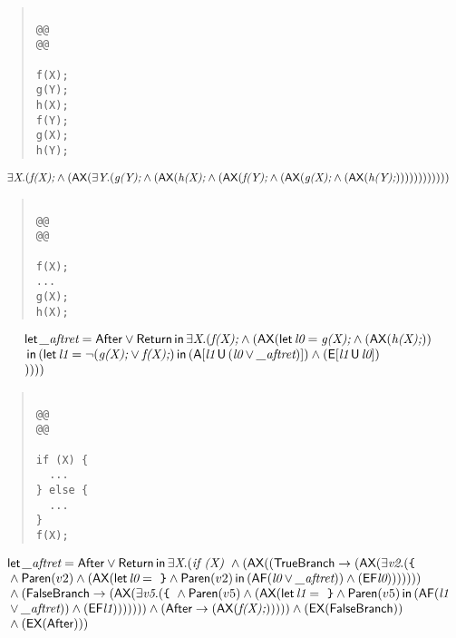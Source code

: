 \documentclass{article}
\newcommand{\U}{\,\mbox{\sf{U}}\,}
\newcommand{\A}{\mbox{\sf{A}}}
\newcommand{\E}{\mbox{\sf{E}}}
\newcommand{\AX}{\mbox{\sf{AX}}}
\newcommand{\EX}{\mbox{\sf{EX}}}
\newcommand{\AF}{\mbox{\sf{AF}}}
\newcommand{\EF}{\mbox{\sf{EF}}}
\newcommand{\mita}[1]{\mbox{\it{{#1}}}}
\newcommand{\msf}[1]{\mbox{\sf{{#1}}}}
\newcommand{\ttlb}{\mbox{\tt \char'173}}
\newcommand{\ttrb}{\mbox{\tt \char'175}}
\begin{document}
\begin{quote}\begin{verbatim}

@@
@@

f(X);
g(Y);
h(X);
f(Y);
g(X);
h(Y);
\end{verbatim}\end{quote}

\[\begin{array}{l}
\exists \mita{X} . (\mita{f(X);} \wedge (\AX(\exists \mita{Y} . (\mita{g(Y);} \wedge (\AX(\mita{h(X);} \wedge (\AX(\mita{f(Y);} \wedge (\AX(\mita{g(X);} \wedge (\AX(\mita{h(Y);}))))))))))))
\end{array}\]

\begin{quote}\begin{verbatim}

@@
@@

f(X);
...
g(X);
h(X);
\end{verbatim}\end{quote}

\[\begin{array}{l}
\mita{\sf{let}} \, \mita{\_aftret} = \msf{After} \vee \msf{Return} \, \mita{\sf{in}} \, \exists \mita{X} . (\mita{f(X);} \wedge (\AX(\mita{\sf{let}} \, \mita{l0} = \mita{g(X);} \wedge (\AX(\mita{h(X);}))\\\mbox{} \, \mita{\sf{in}} \, (\mita{\sf{let}} \, \mita{l1} = \neg (\mita{g(X);} \vee \mita{f(X);}) \, \mita{\sf{in}} \, (\A[\mita{l1} \U (\mita{l0} \vee \mita{\_aftret})]
) \wedge (\E[\mita{l1} \U \mita{l0}]
)\\\mbox{}
)
)))

\end{array}\]

\begin{quote}\begin{verbatim}

@@
@@

if (X) {
  ...
} else {
  ...
}
f(X);
\end{verbatim}\end{quote}

\[\begin{array}{l}
\mita{\sf{let}} \, \mita{\_aftret} = \msf{After} \vee \msf{Return} \, \mita{\sf{in}} \, \exists \mita{X} . (\mita{if (X) } \wedge (\AX((\msf{TrueBranch} \rightarrow (\AX(\exists \mita{v2} . (\mita{{\ttlb}
  }\\\mbox{} \wedge \msf{Paren}(v2) \wedge (\AX(\mita{\sf{let}} \, \mita{l0} = \mita{
{\ttrb}} \wedge \msf{Paren}(v2) \, \mita{\sf{in}} \, (\AF(\mita{l0} \vee \mita{\_aftret})) \wedge (\EF\mita{l0})
))))))\\\mbox{} \wedge (\msf{FalseBranch} \rightarrow (\AX(\exists \mita{v5} . (\mita{{\ttlb}
  } \wedge \msf{Paren}(v5) \wedge (\AX(\mita{\sf{let}} \, \mita{l1} = \mita{
{\ttrb}} \wedge \msf{Paren}(v5) \, \mita{\sf{in}} \, (\AF(\mita{l1}\\\mbox{} \vee \mita{\_aftret})) \wedge (\EF\mita{l1})
)))))) \wedge (\msf{After} \rightarrow (\AX(\mita{f(X);}))))) \wedge (\EX(\msf{FalseBranch}))\\\mbox{} \wedge (\EX(\msf{After})))

\end{array}\]
\end{document}

